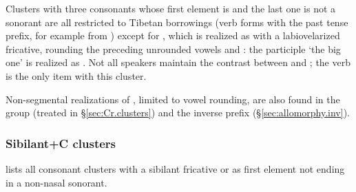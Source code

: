 Clusters with three consonants whose first element is    and the last one is not a sonorant are all restricted to Tibetan borrowings (verb forms with the past tense  prefix, for example  from ) except for , which is realized as  with a labiovelarized fricative, rounding the preceding unrounded vowels  and : the participle  `the big one' is realized as . Not all speakers maintain the contrast between  and ; the verb  is the only item with this cluster.

Non-segmental realizations of , limited to vowel rounding, are also found in the group  (treated in §\ref{sec:Cr.clusters}) and the inverse prefix  (§\ref{sec:allomorphy.inv}).

\subsubsection{Sibilant+C clusters}  \label{sec:sC.clusters}
 lists all consonant clusters with a sibilant fricative  or  as first element not ending in a non-nasal sonorant.  


